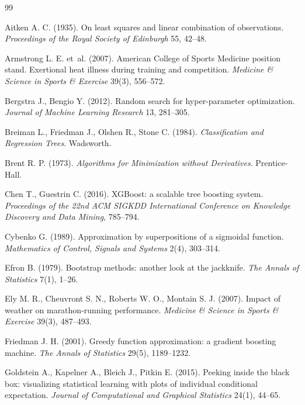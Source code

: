 \documentclass[11pt,a4paper]{article}
\begin{document}
\begin{thebibliography}{99}

Aitken A. C. (1935). On least squares and linear combination of observations. \emph{Proceedings of the Royal Society
of Edinburgh} 55, 42--48.

Armstrong L. E. et~al. (2007). American College of Sports Medicine position stand. Exertional heat illness during
training and competition. \emph{Medicine \& Science in Sports \& Exercise} 39(3), 556--572.

Bergstra J., Bengio Y. (2012). Random search for hyper-parameter optimization. \emph{Journal of Machine Learning
Research} 13, 281--305.

Breiman L., Friedman J., Olshen R., Stone C. (1984). \emph{Classification and Regression Trees}. Wadsworth.

Brent R. P. (1973). \emph{Algorithms for Minimization without Derivatives}. Prentice-Hall.

Chen T., Guestrin C. (2016). XGBoost: a scalable tree boosting system. \emph{Proceedings of the 22nd ACM SIGKDD
International Conference on Knowledge Discovery and Data Mining}, 785--794.

Cybenko G. (1989). Approximation by superpositions of a sigmoidal function. \emph{Mathematics of Control, Signals and
Systems} 2(4), 303--314.

Efron B. (1979). Bootstrap methods: another look at the jackknife. \emph{The Annals of Statistics} 7(1), 1--26.

Ely M. R., Cheuvront S. N., Roberts W. O., Montain S. J. (2007). Impact of weather on marathon-running performance.
\emph{Medicine \& Science in Sports \& Exercise} 39(3), 487--493.

Friedman J. H. (2001). Greedy function approximation: a gradient boosting machine. \emph{The Annals of Statistics}
29(5), 1189--1232.

Goldstein A., Kapelner A., Bleich J., Pitkin E. (2015). Peeking inside the black box: visualizing statistical learning
with plots of individual conditional expectation. \emph{Journal of Computational and Graphical Statistics} 24(1),
44--65.


\end{thebibliography}
\end{document}
